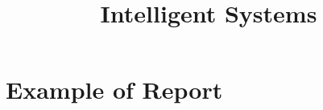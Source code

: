 \documentclass[a4paper,14pt]{article}
\title{Intelligent Systems}
\date{}
\numberwithin{equation}{section}
\begin{document}
    \maketitle
    \tableofcontents
    
    \clearpage
    \section{Example of Report} %
    {} %
    

    \clearpage
    \printbibliography
\end{document}
